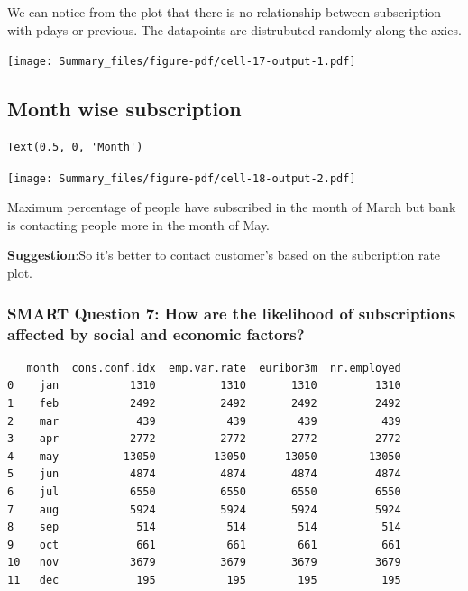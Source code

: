 \documentclass[
  letterpaper,
  DIV=11,
  numbers=noendperiod]{scrartcl}
\begin{document}
We can notice from the plot that there is no relationship between
subscription with pdays or previous. The datapoints are distrubuted
randomly along the axies.

\texttt{[image: Summary\_files/figure-pdf/cell-17-output-1.pdf]}

\hypertarget{month-wise-subscription}{%
\subsection{Month wise subscription}\label{month-wise-subscription}}

\begin{verbatim}
Text(0.5, 0, 'Month')
\end{verbatim}

\texttt{[image: Summary\_files/figure-pdf/cell-18-output-2.pdf]}

Maximum percentage of people have subscribed in the month of March but
bank is contacting people more in the month of May.

\textbf{Suggestion}:So it's better to contact customer's based on the
subcription rate plot.

\hypertarget{smart-question-7-how-are-the-likelihood-of-subscriptions-affected-by-social-and-economic-factors}{%
\subsubsection{SMART Question 7: How are the likelihood of subscriptions
affected by social and economic
factors?}\label{smart-question-7-how-are-the-likelihood-of-subscriptions-affected-by-social-and-economic-factors}}

\begin{verbatim}
   month  cons.conf.idx  emp.var.rate  euribor3m  nr.employed
0    jan           1310          1310       1310         1310
1    feb           2492          2492       2492         2492
2    mar            439           439        439          439
3    apr           2772          2772       2772         2772
4    may          13050         13050      13050        13050
5    jun           4874          4874       4874         4874
6    jul           6550          6550       6550         6550
7    aug           5924          5924       5924         5924
8    sep            514           514        514          514
9    oct            661           661        661          661
10   nov           3679          3679       3679         3679
11   dec            195           195        195          195
\end{verbatim}
\end{document}

